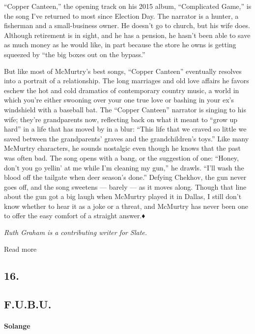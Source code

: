 ``Copper Canteen,'' the opening track on his 2015 album, ``Complicated
Game,'' is the song I've returned to most since Election Day. The
narrator is a hunter, a fisherman and a small-business owner. He doesn't
go to church, but his wife does. Although retirement is in sight, and he
has a pension, he hasn't been able to save as much money as he would
like, in part because the store he owns is getting squeezed by ``the big
boxes out on the bypass.''

But like most of McMurtry's best songs, ``Copper Canteen'' eventually
resolves into a portrait of a relationship. The long marriages and old
love affairs he favors eschew the hot and cold dramatics of contemporary
country music, a world in which you're either swooning over your one
true love or bashing in your ex's windshield with a baseball bat. The
``Copper Canteen'' narrator is singing to his wife; they're grandparents
now, reflecting back on what it meant to ``grow up hard'' in a life that
has moved by in a blur: ``This life that we craved so little we saved
between the grandparents' graves and the grandchildren's toys.'' Like
many McMurtry characters, he sounds nostalgic even though he knows that
the past was often bad. The song opens with a bang, or the suggestion of
one: ``Honey, don't you go yellin' at me while I'm cleaning my gun,'' he
drawls. ``I'll wash the blood off the tailgate when deer season's
done.'' Defying Chekhov, the gun never goes off, and the song sweetens
--- barely --- as it moves along. Though that line about the gun got a
big laugh when McMurtry played it in Dallas, I still don't know whether
to hear it as a joke or a threat, and McMurtry has never been one to
offer the easy comfort of a straight answer.♦

\emph{Ruth Graham is a contributing writer for Slate.}

Read more

\hypertarget{16}{%
\subsection{16.}\label{16}}

\hypertarget{--fubu}{%
\subsection{\texorpdfstring{ F.U.B.U.}{  F.U.B.U.}}\label{--fubu}}

\hypertarget{solange}{%
\paragraph{Solange}\label{solange}}

